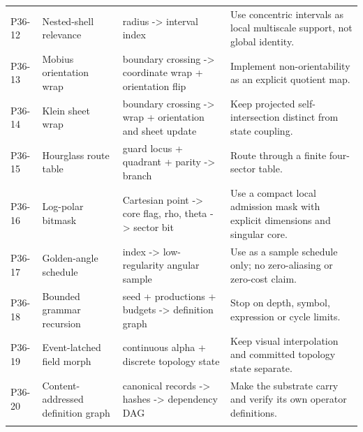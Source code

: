 \begin{longtable}{>{\raggedright\arraybackslash}p{1.1cm}>{\raggedright\arraybackslash}p{3.5cm}>{\raggedright\arraybackslash}p{4.2cm}>{\raggedright\arraybackslash}p{7.2cm}}
\addlinespace[1.5pt]
P36-12 & Nested-shell relevance & radius -> interval index & Use concentric intervals as local multiscale support, not global identity. \\
\addlinespace[1.5pt]
P36-13 & Mobius orientation wrap & boundary crossing -> coordinate wrap + orientation flip & Implement non-orientability as an explicit quotient map. \\
\addlinespace[1.5pt]
P36-14 & Klein sheet wrap & boundary crossing -> wrap + orientation and sheet update & Keep projected self-intersection distinct from state coupling. \\
\addlinespace[1.5pt]
P36-15 & Hourglass route table & guard locus + quadrant + parity -> branch & Route through a finite four-sector table. \\
\addlinespace[1.5pt]
P36-16 & Log-polar bitmask & Cartesian point -> core flag, rho, theta -> sector bit & Use a compact local admission mask with explicit dimensions and singular core. \\
\addlinespace[1.5pt]
P36-17 & Golden-angle schedule & index -> low-regularity angular sample & Use as a sample schedule only; no zero-aliasing or zero-cost claim. \\
\addlinespace[1.5pt]
P36-18 & Bounded grammar recursion & seed + productions + budgets -> definition graph & Stop on depth, symbol, expression or cycle limits. \\
\addlinespace[1.5pt]
P36-19 & Event-latched field morph & continuous alpha + discrete topology state & Keep visual interpolation and committed topology state separate. \\
\addlinespace[1.5pt]
P36-20 & Content-addressed definition graph & canonical records -> hashes -> dependency DAG & Make the substrate carry and verify its own operator definitions. \\
\addlinespace[1.5pt]
\bottomrule
\end{longtable}
